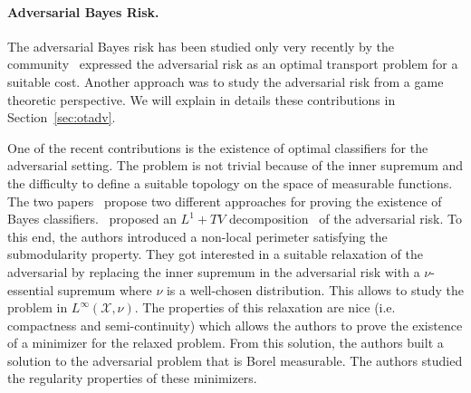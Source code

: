 \paragraph{Adversarial Bayes Risk.} The adversarial Bayes risk has been studied only very recently by the community~\cite{bhagoji2019lower,pydi2019adversarial,trillos2020adversarial} expressed the adversarial risk as an optimal transport problem for a suitable cost. Another approach was to study the adversarial risk from a game theoretic perspective. We will explain in details these contributions in Section~\ref{sec:otadv}. 


One of the recent contributions is the existence of  optimal classifiers for the adversarial setting.  The problem is not trivial because of the inner supremum and the difficulty to define a suitable topology on the space of measurable functions. The two papers~\citep{awasthi2021existence,bungert2021geometry} propose two different approaches for proving the existence of Bayes classifiers.~\cite{bungert2021geometry} proposed an $L^1+TV$ decomposition~\citep{chan2005aspects} of the adversarial risk.  To this end, the authors introduced a non-local perimeter satisfying the submodularity property. They got interested in a suitable relaxation of the adversarial by replacing the inner supremum in the adversarial risk with a  $\nu$-essential supremum where $\nu$ is a well-chosen distribution. This allows to study the problem in $L^\infty(\mathcal{X},\nu)$. The properties of this relaxation are nice (i.e. compactness and semi-continuity) which allows the authors to prove the existence of a minimizer for the relaxed problem. From this solution, the authors built a solution to the adversarial problem that is Borel measurable. The authors studied the regularity properties of these minimizers.

 